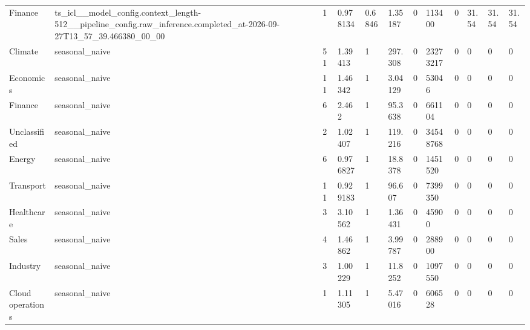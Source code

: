 \begin{tabular}{llllllllllll}
Finance & ts\_icl\_\_model\_config.context\_length-512\_\_pipeline\_config.raw\_inference.completed\_at-2026-09-27T13\_57\_39.466380\_00\_00 & 1 & 0.978134 & 0.6846 & 1.35187 & 0 & 113400 & 0 & 31.54 & 31.54 & 31.54 \\
Climate & seasonal\_naive & 51 & 1.39413 & 1 & 297.308 & 0 & 23273217 & 0 & 0 & 0 & 0 \\
Economics & seasonal\_naive & 11 & 1.46342 & 1 & 3.04129 & 0 & 53046 & 0 & 0 & 0 & 0 \\
Finance & seasonal\_naive & 6 & 2.462 & 1 & 95.3638 & 0 & 661104 & 0 & 0 & 0 & 0 \\
Unclassified & seasonal\_naive & 2 & 1.02407 & 1 & 119.216 & 0 & 34548768 & 0 & 0 & 0 & 0 \\
Energy & seasonal\_naive & 6 & 0.976827 & 1 & 18.8378 & 0 & 1451520 & 0 & 0 & 0 & 0 \\
Transport & seasonal\_naive & 11 & 0.929183 & 1 & 96.607 & 0 & 7399350 & 0 & 0 & 0 & 0 \\
Healthcare & seasonal\_naive & 3 & 3.10562 & 1 & 1.36431 & 0 & 45900 & 0 & 0 & 0 & 0 \\
Sales & seasonal\_naive & 4 & 1.46862 & 1 & 3.99787 & 0 & 288900 & 0 & 0 & 0 & 0 \\
Industry & seasonal\_naive & 3 & 1.00229 & 1 & 11.8252 & 0 & 1097550 & 0 & 0 & 0 & 0 \\
Cloud operations & seasonal\_naive & 1 & 1.11305 & 1 & 5.47016 & 0 & 606528 & 0 & 0 & 0 & 0 \\
\bottomrule
\end{tabular}
